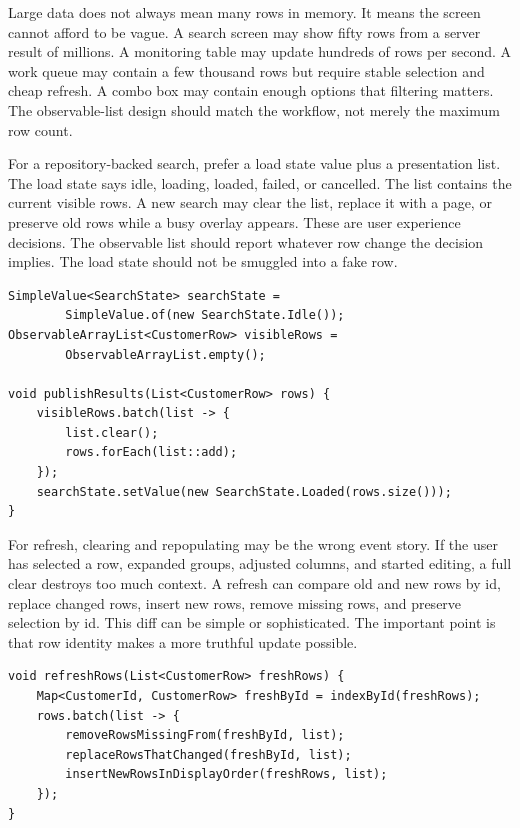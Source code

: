 Large data does not always mean many rows in memory. It means the screen cannot
afford to be vague. A search screen may show fifty rows from a server result of
millions. A monitoring table may update hundreds of rows per second. A work
queue may contain a few thousand rows but require stable selection and cheap
refresh. A combo box may contain enough options that filtering matters. The
observable-list design should match the workflow, not merely the maximum row
count.

For a repository-backed search, prefer a load state value plus a presentation
list. The load state says idle, loading, loaded, failed, or cancelled. The list
contains the current visible rows. A new search may clear the list, replace it
with a page, or preserve old rows while a busy overlay appears. These are user
experience decisions. The observable list should report whatever row change the
decision implies. The load state should not be smuggled into a fake row.

\begin{lstlisting}[caption={Search state and visible rows are different facts.}]
SimpleValue<SearchState> searchState =
        SimpleValue.of(new SearchState.Idle());
ObservableArrayList<CustomerRow> visibleRows =
        ObservableArrayList.empty();

void publishResults(List<CustomerRow> rows) {
    visibleRows.batch(list -> {
        list.clear();
        rows.forEach(list::add);
    });
    searchState.setValue(new SearchState.Loaded(rows.size()));
}
\end{lstlisting}

For refresh, clearing and repopulating may be the wrong event story. If the user
has selected a row, expanded groups, adjusted columns, and started editing, a
full clear destroys too much context. A refresh can compare old and new rows by
id, replace changed rows, insert new rows, remove missing rows, and preserve
selection by id. This diff can be simple or sophisticated. The important point
is that row identity makes a more truthful update possible.

\begin{lstlisting}[caption={Refresh by id instead of blind reset.}]
void refreshRows(List<CustomerRow> freshRows) {
    Map<CustomerId, CustomerRow> freshById = indexById(freshRows);
    rows.batch(list -> {
        removeRowsMissingFrom(freshById, list);
        replaceRowsThatChanged(freshById, list);
        insertNewRowsInDisplayOrder(freshRows, list);
    });
}
\end{lstlisting}


